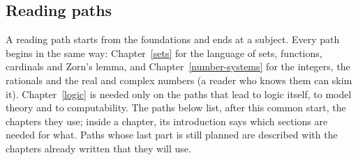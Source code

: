 \subsection{Reading paths}\label{introduction:subsection-reading-paths}

A reading path starts from the foundations and ends at a subject. Every path begins in the same way: Chapter~\ref{sets} for the language of sets, functions, cardinals and Zorn's
lemma, and Chapter~\ref{number-systems} for the integers, the rationals and the real and complex numbers (a reader who knows them can skim it). Chapter~\ref{logic} is needed only on
the paths that lead to logic itself, to model theory and to computability. The paths below list, after this common start, the chapters they use; inside a chapter, its introduction
says which sections are needed for what. Paths whose last part is still planned are described with the chapters already written that they will use.
